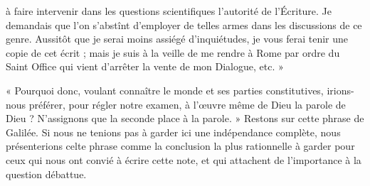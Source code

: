 \documentclass[a4paper, 11pt, oneside, landscape]{article}
\begin{document}
à faire intervenir dans les questions scientifiques l'autorité de l'Écriture. Je demandais que l'on s'abstînt d'employer de telles armes dans les discussions de ce genre. Aussitôt que je serai moins assiégé d'inquiétudes, je vous ferai tenir une copie de cet écrit ; mais je suis à la veille de me rendre à Rome par ordre du Saint Office qui vient d'arrêter la vente de mon Dialogue, etc. »

« Pourquoi donc, voulant connaître le monde et ses parties constitutives, irions-nous préférer, pour régler notre examen, à l'œuvre même de Dieu la parole de Dieu ? N'assignons que la seconde place à la parole. » Restons sur cette phrase de Galilée. Si nous ne tenions pas à garder ici une indépendance complète, nous présenterions celte phrase comme la conclusion la plus rationnelle à garder pour ceux qui nous ont convié à écrire cette note, et qui attachent de l'importance à la question débattue.
\clearpage
\end{document}
